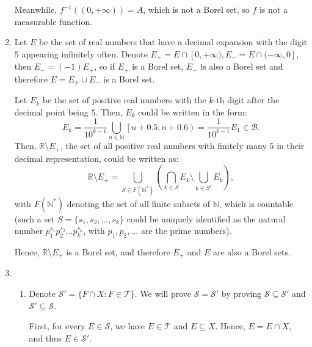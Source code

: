 \begin{enumerate}[label=\textbf{2B.\arabic*}]
    Meanwhile, \( f^{-1}((0, +\infty)) = A \), which is not a Borel set, so \( f
    \) is not a measurable function.
  \item 
    Let \( E \) be the set of real numbers that have a decimal expansion with
    the digit \( 5 \) appearing infinitely often. Denote \( E_{+} = E \cap [0,
    +\infty), E_{-} = E \cap (-\infty, 0]   \), then \( E_{-} = (-1)E_{+} \), so
    if \( E_{+} \) is a Borel set, \( E_{-} \) is also a Borel set and therefore
    \( E = E_{+} \cup E_{-} \) is a Borel set.

    Let \( E_{k} \) be the set of positive real numbers with the \( k \)-th digit
    after the decimal point being \( 5 \). Then, \( E_{k} \) could be written in
    the form:
    \[
      E_{k} =  \frac{1}{10^{k-1}}\bigcup_{n \in \mathbb{N}}\left[ n + 0.5, n +
      0.6 \right) = \frac{1}{10^{k-1}}E_{1} \in \mathcal{B}
    .\] 
    Then, \( \mathbb{R} \setminus E_{+} \), the set of all positive real numbers
    with finitely many \( 5 \) in their decimal representation, could be written
    as:
    \[
      \mathbb{R} \setminus E_{+} = \bigcup_{S \in F(\mathbb{N}^{*})} \left( 
        \bigcap_{k \in S} E_{k} \setminus \bigcup_{k \in S^{c}} E_{k}
      \right)
    ,\] with \( F(\mathbb{N}^{*}) \) denoting the set of all finite subsets of
    \( \mathbb{N} \), which is countable (such a set \( S = \{s_{1}, s_{2},
    \ldots, s_{k} \}   \) could be uniquely identified as
    the natural number \( p_{1}^{s_{1}}p_{2}^{s_{2}}\ldots p_{k}^{s_{k}} \),
    with \( p_{1}, p_{2}, \ldots  \) are the prime numbers).

    Hence, \( \mathbb{R} \setminus E_{+} \) is a Borel set, and therefore \( E_{+}
    \) and \( E \) are also a Borel sets.
  \item \begin{enumerate}[label=(\alph*)]
    \item Denote \( \mathcal{S}' = \{F \cap X: F \in \mathcal{T}\}   \). We will
      prove \( \mathcal{S} = \mathcal{S}' \) by proving \( \mathcal{S}
      \subseteq \mathcal{S}' \) and \( \mathcal{S}' \subseteq \mathcal{S}\).
      
      First, for every \( E \in \mathcal{S} \), we have \( E \in \mathcal{T} \)
      and \( E \subseteq X \). Hence, \( E = E \cap X \), and thus \( E \in
      \mathcal{S}' \).


\end{enumerate}
\end{enumerate}
